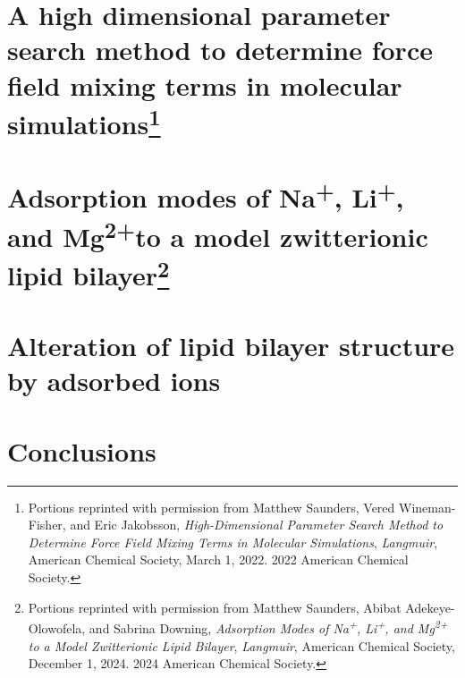 \documentclass[12pt,openany,final]{book}
\newcommand{\na}{Na\textsuperscript{+}}
\newcommand{\li}{Li\textsuperscript{+}}
\newcommand{\mg}{Mg\textsuperscript{2+}}
\begin{document}
\chapter[A high dimensional parameter search method to...]{A high dimensional parameter search method to determine force field mixing terms in molecular simulations\footnote{
Portions reprinted with permission from Matthew Saunders, Vered Wineman-Fisher, and Eric Jakobsson, \textit{High-Dimensional Parameter Search Method to Determine Force Field Mixing Terms in Molecular Simulations}, 
\textit{Langmuir}, American Chemical Society, March 1, 2022. 
\textcopyright{} 2022 American Chemical Society.
}}

\chapter[Adsorption modes of \na, \li, and \mg to a model zwitterionic lipid bilayer]{Adsorption modes of \na, \li, and \mg to a model zwitterionic lipid bilayer\footnote{
    Portions reprinted with permission from Matthew Saunders, Abibat Adekeye-Olowofela, and Sabrina Downing, \textit{Adsorption Modes of Na\textsuperscript{+}, Li\textsuperscript{+}, and Mg\textsuperscript{2+} to a Model Zwitterionic Lipid Bilayer}, 
\textit{Langmuir}, American Chemical Society, December 1, 2024. 
\textcopyright{} 2024 American Chemical Society.
}}

\chapter[Alteration of bilayer structure by adsorbed ions]{Alteration of lipid bilayer structure by adsorbed ions}

\chapter{Conclusions}


\end{document}
